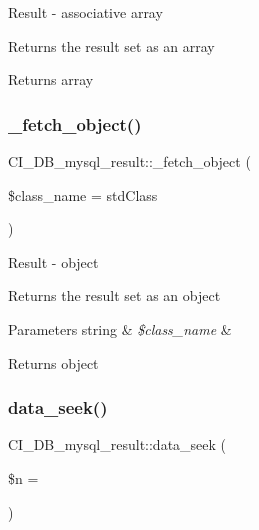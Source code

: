 Result -\/ associative array

Returns the result set as an array

\begin{DoxyReturn}{Returns}
array 
\end{DoxyReturn}
\mbox{\label{class_c_i___d_b__mysql__result_a1904744acf38d4c7ffb4787277da069b}} 
\subsubsection{\texorpdfstring{\+\_\+fetch\+\_\+object()}{\_fetch\_object()}}
{\footnotesize\ttfamily C\+I\+\_\+\+D\+B\+\_\+mysql\+\_\+result\+::\+\_\+fetch\+\_\+object (\begin{DoxyParamCaption}\item[{}]{\$class\+\_\+name = {\ttfamily \textquotesingle{}stdClass\textquotesingle{}} }\end{DoxyParamCaption})\hspace{0.3cm}{\ttfamily [protected]}}

Result -\/ object

Returns the result set as an object


\begin{DoxyParams}[1]{Parameters}
string & {\em \$class\+\_\+name} & \\
\hline
\end{DoxyParams}
\begin{DoxyReturn}{Returns}
object 
\end{DoxyReturn}
\mbox{\label{class_c_i___d_b__mysql__result_a11f50d6f7a4cc3d953bed4c2f91151e8}} 
\subsubsection{\texorpdfstring{data\+\_\+seek()}{data\_seek()}}
{\footnotesize\ttfamily C\+I\+\_\+\+D\+B\+\_\+mysql\+\_\+result\+::data\+\_\+seek (\begin{DoxyParamCaption}\item[{}]{\$n = {} }\end{DoxyParamCaption})}

